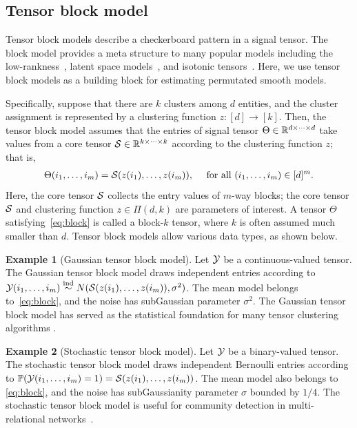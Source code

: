 \documentclass[11pt]{article}
\theoremstyle{definition}
\newtheorem{example}{Example}
\begin{document}
\subsection{Tensor block model}\label{subsec:bm}
Tensor block models describe a checkerboard pattern in a signal tensor. The block model provides a meta structure to many popular models including the low-rankness~\citep{young2018universality}, latent space models~\citep{wang2018learning}, and isotonic tensors~\citep{pananjady2020isotonic}. Here, we use tensor block models as a building block for estimating permutated smooth models. 

Specifically, suppose that there are $k$ clusters among $d$ entities, and the cluster assignment is represented by a clustering function $z \colon[d]\rightarrow[k]$. Then, the tensor block model assumes that the entries of signal tensor $\Theta\in\mathbb{R}^{d\times \cdots \times d}$ take values from a core tensor $\mathcal{S}\in\mathbb{R}^{k\times\cdots\times k}$ according to the clustering function $z$; that is,
\begin{align}\label{eq:block}
    \Theta(i_1,\ldots,i_m) = \mathcal{S}(z(i_1),\ldots,z(i_m)), \quad \text{ for all } (i_1,\ldots,i_m)\in[d]^m.
\end{align}
Here, the core tensor $\mathcal{S}$ collects the entry values of $m$-way blocks; the core tensor $\mathcal{S}$ and clustering function $z\in \Pi(d,k)$ are parameters of interest. A tensor $\Theta$ satisfying~\eqref{eq:block} is called a block-$k$ tensor, where $k$ is often assumed much smaller than $d$. Tensor block models allow various data types, as shown below. 

\begin{example}[Gaussian tensor block model] Let $\mathcal{Y}$ be a continuous-valued tensor. The Gaussian tensor block model draws independent entries according to $\mathcal{Y}(i_1,\ldots,i_m)\stackrel{\text{ind}}{\sim} N(\mathcal{S}(z(i_1),\ldots,z(i_m)),\sigma^2)$. The mean model belongs to~\eqref{eq:block}, and the noise has subGaussian parameter $\sigma^2$. The Gaussian tensor block model has served as the statistical foundation for many tensor clustering algorithms \citep{wang2019multiway,han2020exact}.
\end{example}

\begin{example}[Stochastic tensor block model] Let $\mathcal{Y}$ be a binary-valued tensor. The stochastic tensor block model draws independent Bernoulli entries according to $\mathbb{P}(\mathcal{Y}(i_1,\ldots,i_m)=1)=\mathcal{S}(z(i_1),\ldots,z(i_m))$. The mean model also belongs to \eqref{eq:block}, and the noise has subGaussianity parameter $\sigma$ bounded by $1/4$.  
The stochastic tensor block model is useful for community detection in multi-relational networks~\citep{bickel2009nonparametric,gao2015rate}.
\end{example}
\end{document}
